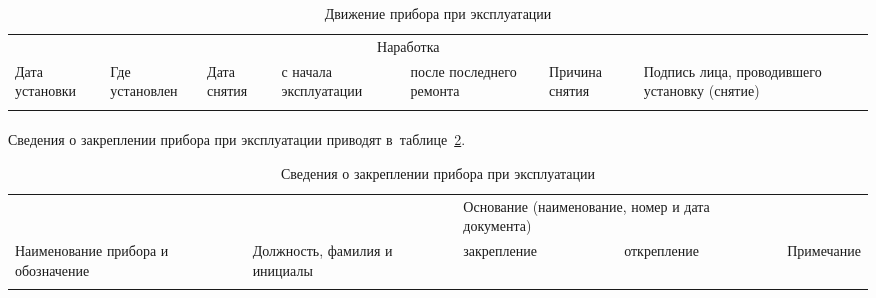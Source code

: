 	\begin{table}[H]
		\caption{\label{tab:move} Движение прибора при эксплуатации}
		{\small
			\begin{tabular}{|p{2cm}|p{2cm}|p{2cm}|p{2cm}|p{2cm}|p{2cm}|p{2.5cm}|}
				\hline
				&&& \multicolumn{2}{c|}{Наработка} && \\
				\cline{4-5}
				Дата \newline установки&Где установлен &Дата \newline снятия &с начала эксплуатации& после последнего ремонта & Причина снятия & Подпись лица, проводившего установку (снятие)\\
				\hline
				\rule{0cm}{19cm}& & & & & & \\
				\hline
			\end{tabular}
		}
	\end{table}

	\newpage
	
	
	\newpage
	
\paragraph{} Сведения о закреплении прибора при эксплуатации приводят в~таблице~\ref{tab:zakrep}.

		\begin{table}[H]
		\caption{\label{tab:zakrep} Сведения о закреплении прибора при эксплуатации}
		{\small
			\begin{tabular}{|p{3.4cm}|p{3cm}|p{3cm}|p{3cm}|p{3cm}|}
				\hline
				&& \multicolumn{2}{p{6cm}|}{Основание (наименование, номер и дата документа)} & \\
				\cline{3-4}
				Наименование прибора и обозначение &Должность, фамилия и инициалы & закрепление &открепление& Примечание \\
				\hline
				\rule{0cm}{19cm}& & & &  \\
				\hline
			\end{tabular}
		}
	\end{table}




